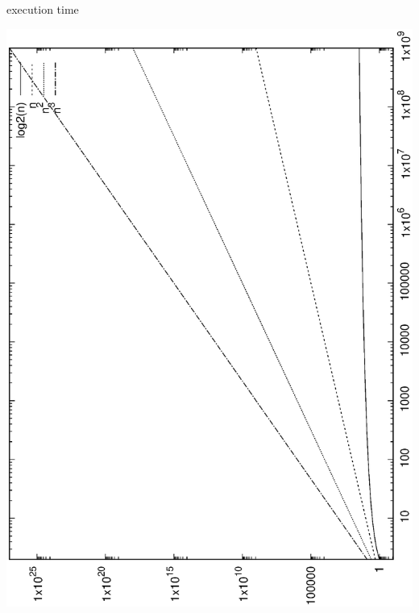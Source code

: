 \documentclass[10pt, t]{beamer}
\begin{document}
  \begin{frame}{execution time}
    \vspace{-6ex}
    \begin{center}
      \includegraphics[width=.70\textwidth,angle=-90]{execution-time}
    \end{center}
  \end{frame}
\end{document}
